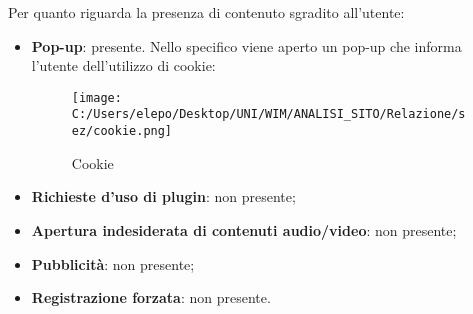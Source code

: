 Per quanto riguarda la presenza di contenuto sgradito all'utente:
	\begin{itemize}
		\item \textbf{Pop-up}: presente. Nello specifico viene aperto un pop-up che informa l'utente dell'utilizzo di cookie: \\ 
								\begin{center}
\begin{figure}[h!]
           \begin{center}
           \texttt{[image: C:/Users/elepo/Desktop/UNI/WIM/ANALISI\_SITO/Relazione/sez/cookie.png]}
           \caption{Cookie}
           \end{center}
  \end{figure}
\end{center}
		\item \textbf{Richieste d'uso di plugin}: non presente;
		\item \textbf{Apertura indesiderata di contenuti audio/video}: non presente;
		\item \textbf{Pubblicità}: non presente;
		\item \textbf{Registrazione forzata}: non presente.
	\end{itemize}